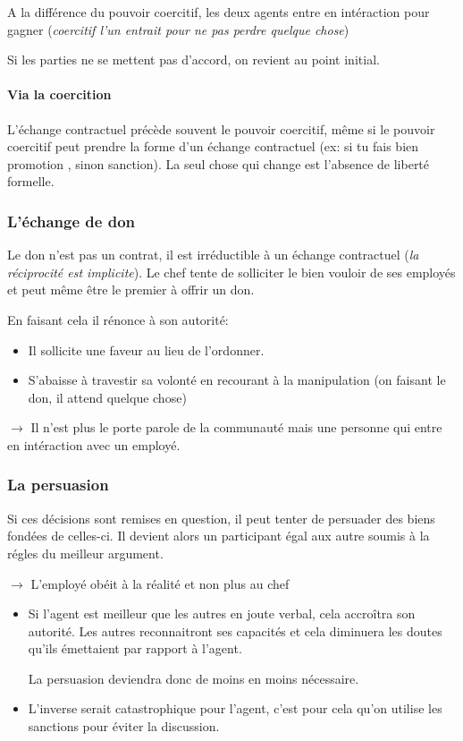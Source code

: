 \documentclass[11pt]{article} %
\begin{document}
A la différence du pouvoir coercitif, les deux agents entre en
intéraction pour gagner (\textit{coercitif l'un entrait pour ne pas
perdre quelque chose})

Si les parties ne se mettent pas d'accord, on revient au point initial.

\paragraph{Via la coercition} L'échange contractuel précède souvent
le pouvoir coercitif, même si le pouvoir coercitif peut prendre la
forme d'un échange contractuel (ex: si tu fais bien promotion , sinon
sanction). La seul chose qui change est l'absence de liberté formelle.


\subsubsection{L'échange de don} 

Le don n'est pas un contrat, il est irréductible à un échange
contractuel (\textit{la réciprocité est implicite}). Le chef tente de
solliciter le bien vouloir de ses employés et peut même être le
premier à offrir un don. 

En faisant cela il rénonce à son autorité:

\begin{itemize}
 \item Il sollicite une faveur au lieu de l'ordonner.
 \item S'abaisse à travestir sa volonté en recourant à la
 manipulation (on faisant le don, il attend quelque chose)
\end{itemize}

$\to$ Il n'est plus le porte parole de la communauté mais une personne
qui entre en intéraction avec un employé.

\subsubsection{La persuasion} 

Si ces décisions sont remises en question, il peut tenter de persuader
des biens fondées de celles-ci. Il devient alors un participant égal
aux autre soumis à la régles du meilleur argument. 

$\to$ L'employé obéit à la réalité et non plus au chef

\begin{itemize}
    \item Si l'agent est meilleur que les autres en joute verbal, cela accroîtra
son autorité. Les autres reconnaitront ses capacités et cela diminuera
les doutes qu'ils émettaient par rapport à l'agent. 

La persuasion deviendra donc de moins en moins nécessaire.

\item L'inverse serait catastrophique pour l'agent, c'est pour cela qu'on
utilise les sanctions pour éviter la discussion.
\end{itemize}
\end{document}
